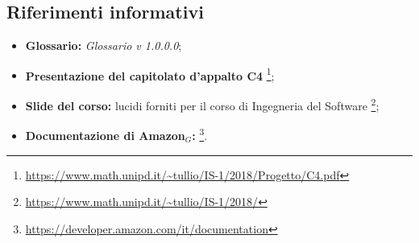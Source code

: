 \subsection{Riferimenti informativi}
\begin{itemize}
	
	\item \textbf{Glossario:} \textit{Glossario v 1.0.0.0};
	\item \textbf{Presentazione del capitolato d'appalto C4} \footnote{\url{https://www.math.unipd.it/~tullio/IS-1/2018/Progetto/C4.pdf}};
	\item \textbf{Slide del corso:} lucidi forniti per il corso di Ingegneria del Software \footnote{\url{https://www.math.unipd.it/~tullio/IS-1/2018/}};
	\item \textbf{Documentazione di Amazon$_{G}$:} \footnote{\url{https://developer.amazon.com/it/documentation}}.
\end{itemize}
